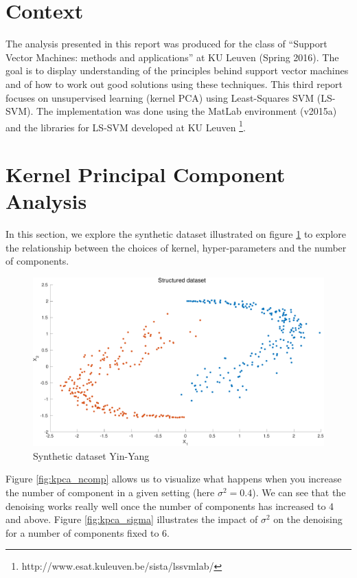 \documentclass[11pt, a4paper]{article}
\begin{document}

\tableofcontents
\newpage

\section*{Context}

The analysis presented in this report was produced for the class of
``Support Vector Machines: methods and applications'' at KU Leuven
(Spring 2016). The goal is to display understanding of the principles
behind support vector machines and of how to work out good solutions
using these techniques. This third report focuses on unsupervised
learning (kernel PCA) using Least-Squares SVM (LS-SVM). The
implementation was done using the MatLab environment (v2015a) and the
libraries for LS-SVM developed at KU Leuven
\footnote{http://www.esat.kuleuven.be/sista/lssvmlab/}.

\section{Kernel Principal Component Analysis}

In this section, we explore the synthetic dataset illustrated on
figure \ref{fig:kpca_dataset} to explore the relationship between the
choices of kernel, hyper-parameters and the number of components. 

\begin{figure}[H]
  \centering
  \includegraphics[scale=.40]{kpca_dataset.pdf}
  \caption{Synthetic dataset Yin-Yang}
  \label{fig:kpca_dataset}
\end{figure}

Figure \ref{fig:kpca_ncomp} allows us to visualize what happens when
you increase the number of component in a given setting (here
$\sigma^2=0.4$). We can see that the denoising works really well once
the number of components has increased to 4 and above. Figure
\ref{fig:kpca_sigma} illustrates the impact of $\sigma^2$ on the
denoising for a number of components fixed to 6.
\end{document}
